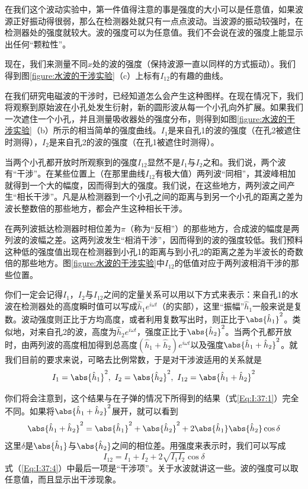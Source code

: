 在我们这个波动实验中，第一件值得注意的事是强度的大小可以是任意值，如果波源正好振动得很弱，那么在检测器处就只有一点点波动。当波源的振动较强时，在检测器处的强度就较大。波的强度可以为任意值。我们不会说在波的强度上能显示出任何“颗粒性”。

现在，我们来测量不同$x$处的波的强度（保持波源一直以同样的方式振动）。我们得到图\ref{figure:水波的干涉实验}（c）上标有$I_{12}$的有趣的曲线。

在我们研究电磁波的干涉时，已经知道怎么会产生这种图样。在现在情况下，我们将观察到原始波在小孔处发生衍射，新的圆形波从每一个小孔向外扩展。如果我们一次遮住一个小孔，并且测量吸收器处的强度分布，则得到如图\ref{figure:水波的干涉实验}（b）所示的相当简单的强度曲线。$I_1$是来自孔1的波的强度（在孔2被遮住时测得），$I_2$是来自孔2的波的强度（在孔1被遮住时测得）。

当两个小孔都开放时所观察到的强度$I_{12}$显然不是$I_1$与$I_2$之和。我们说，两个波有“干涉”。在某些位置上（在那里曲线$I_{12}$有极大值）两列波“同相”，其波峰相加就得到一个大的幅度，因而得到大的强度。我们说，在这些地方，两列波之间产生“相长干涉”。凡是从检测器到一个小孔之间的距离与到另一个小孔的距离之差为波长整数倍的那些地方，都会产生这种相长干涉。

在两列波抵达检测器时相位差为$\pi$（称为“反相”）的那些地方，合成波的幅度是两列波的波幅之差。这两列波发生“相消干涉”，因而得到的波的强度较低。我们预料这种低的强度值出现在检测器到小孔1的距离与到小孔2的距离之差为半波长的奇数倍的那些地方。图\ref{figure:水波的干涉实验}中$I_{12}$的低值对应于两列波相消干涉的那些位置。

你们一定会记得$I_1$，$I_2$与$I_{12}$之间的定量关系可以用以下方式来表示：来自孔1的水波在检测器处的高度瞬时值可以写成$\hat{h}_1e^{i\omega t}$（的实部），这里“振幅”$\hat{h}_1$一般来说是复数。波动强度则正比于方均高度，或者利用复数写出时，则正比于$\abs{\hat{h}_1}^2$。类似地，对来自孔2的波，高度为$\hat{h}_2e^{i\omega t}$，强度正比于$\abs{\hat{h}_2}^2$。当两个孔都开放时，由两列波的高度相加得到总高度$(\hat{h}_1 + \hat{h}_2)e^{i\omega t}$以及强度$\abs{\hat{h}_1 + \hat{h}_2}^2$。就我们目前的要求来说，可略去比例常数，于是对干涉波适用的关系就是
\begin{equation}
    \label{Eq:I:37:2}
    I_1 = \abs{\hat{h}_1}^2,~I_2 = \abs{\hat{h}_2}^2,~I_{12} = \abs{\hat{h}_1 + \hat{h}_2}^2
\end{equation}

你们将会注意到，这个结果与在子弹的情况下所得到的结果（式\ref{Eq:I:37:1}）完全不同。如果将$\abs{\hat{h}_1 + \hat{h}_2}^2$展开，就可以看到
\begin{equation}
    \label{Eq:I:37:3}
    \abs{\hat{h}_1 + \hat{h}_2}^2 = \abs{\hat{h}_1}^2 + \abs{\hat{h}_2}^2 + 2\abs{\hat{h}_1}\abs{\hat{h}_2}\cos\delta
\end{equation}
这里$\delta$是$\abs{\hat{h}_1}$与$\abs{\hat{h}_2}$之间的相位差。用强度来表示时，我们可以写成
\begin{equation}
    \label{Eq:I:37:4}
    I_{12} = I_1 + I_2 + 2\sqrt{I_1I_2}\cos\delta
\end{equation}
式（\ref{Eq:I:37:4}）中最后一项是“干涉项”。关于水波就讲这一些。波的强度可以取任意值，而且显示出干涉现象。

